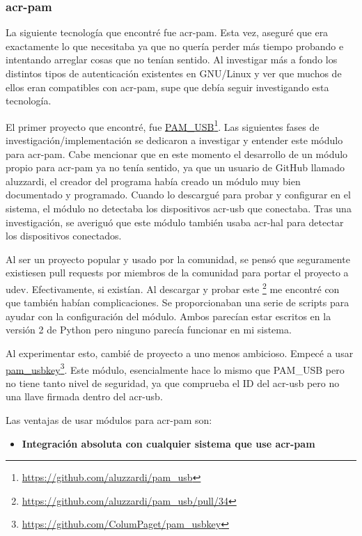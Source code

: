 \documentclass[titlepage, 12pt, a4paper]{article}
\begin{document}
{\subsubsection{\gls{acr-pam}}
La siguiente tecnología que encontré fue \gls{acr-pam}. Esta vez, aseguré que era exactamente lo que necesitaba ya que no quería perder más tiempo probando e intentando arreglar cosas que no tenían sentido. Al investigar más a fondo los distintos tipos de autenticación existentes en \gls{GNU/Linux} y ver que muchos de ellos eran compatibles con \gls{acr-pam}, supe que debía seguir investigando esta tecnología. \par
El primer proyecto que encontré, fue \href{https://github.com/aluzzardi/pam_usb}{PAM\_USB}\footnote{\url{https://github.com/aluzzardi/pam_usb}}. Las siguientes fases de investigación/implementación se dedicaron a investigar y entender este módulo para \gls{acr-pam}. Cabe mencionar que en este momento el desarrollo de un módulo propio para \gls{acr-pam} ya no tenía sentido, ya que un usuario de \gls{GitHub} llamado aluzzardi, el creador del programa había creado un módulo muy bien documentado y programado. Cuando lo descargué para probar y configurar en el sistema, el módulo no detectaba los dispositivos \gls{acr-usb} que conectaba. Tras una investigación, se averiguó que este módulo también usaba \gls{acr-hal} para detectar los dispositivos conectados.\par
Al ser un proyecto popular y usado por la comunidad, se pensó que seguramente existiesen pull requests por miembros de la comunidad para portar el proyecto a \gls{udev}. Efectivamente, si existían. Al descargar y probar este \footnote{\url{https://github.com/aluzzardi/pam_usb/pull/34}} me encontré con que también habían complicaciones. Se proporcionaban una serie de scripts para ayudar con la configuración del módulo. Ambos parecían estar escritos en la versión 2 de Python pero ninguno parecía funcionar en mi sistema.\par Al experimentar esto, cambié de proyecto a uno menos ambicioso. Empecé a usar \href{https://github.com/ColumPaget/pam_usbkey}{pam\_usbkey}\footnote{\url{https://github.com/ColumPaget/pam_usbkey}}. Este módulo, esencialmente hace lo mismo que PAM\_USB pero no tiene tanto nivel de seguridad, ya que comprueba el ID del \gls{acr-usb} pero no una llave firmada dentro del \gls{acr-usb}. \par
Las ventajas de usar módulos para \gls{acr-pam} son:
\begin{itemize}
	\item{\textbf{Integración absoluta con cualquier sistema que use \gls{acr-pam}}}\par

\end{itemize}}
\end{document}

